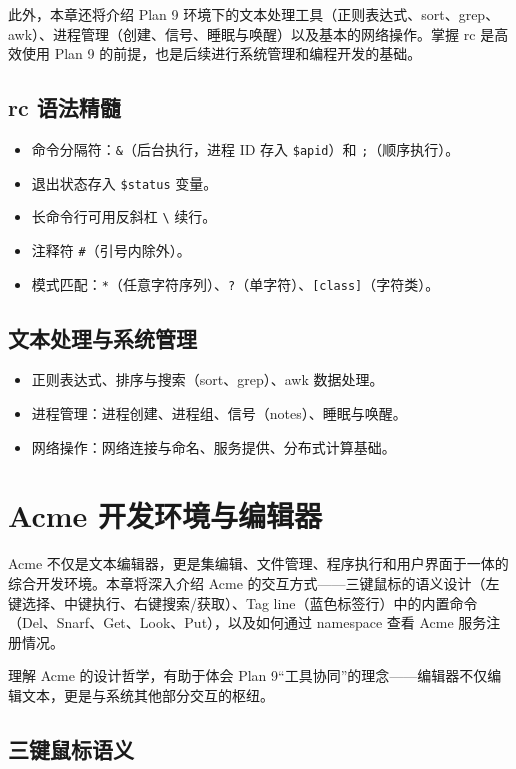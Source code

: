 \documentclass[12pt,UTF8]{ctexbook}
\begin{document}
此外，本章还将介绍 Plan 9 环境下的文本处理工具（正则表达式、sort、grep、awk）、进程管理（创建、信号、睡眠与唤醒）以及基本的网络操作。掌握 rc 是高效使用 Plan 9 的前提，也是后续进行系统管理和编程开发的基础。
	
\section{rc 语法精髓}

\begin{itemize}
\item 命令分隔符：\texttt{\&}（后台执行，进程 ID 存入 \texttt{\$apid}）和 \texttt{;}（顺序执行）。
\item 退出状态存入 \texttt{\$status} 变量。
\item 长命令行可用反斜杠 \texttt{\textbackslash} 续行。
\item 注释符 \texttt{\#}（引号内除外）。
\item 模式匹配：\texttt{*}（任意字符序列）、\texttt{?}（单字符）、\texttt{[class]}（字符类）。
\end{itemize}

\section{文本处理与系统管理}

\begin{itemize}
\item 正则表达式、排序与搜索（sort、grep）、awk 数据处理。
\item 进程管理：进程创建、进程组、信号（notes）、睡眠与唤醒。
\item 网络操作：网络连接与命名、服务提供、分布式计算基础。
\end{itemize}
	
\chapter{Acme 开发环境与编辑器}

Acme 不仅是文本编辑器，更是集编辑、文件管理、程序执行和用户界面于一体的综合开发环境。本章将深入介绍 Acme 的交互方式——三键鼠标的语义设计（左键选择、中键执行、右键搜索/获取）、Tag line（蓝色标签行）中的内置命令（Del、Snarf、Get、Look、Put），以及如何通过 namespace 查看 Acme 服务注册情况。

理解 Acme 的设计哲学，有助于体会 Plan 9“工具协同”的理念——编辑器不仅编辑文本，更是与系统其他部分交互的枢纽。

\section{三键鼠标语义}
\end{document}

